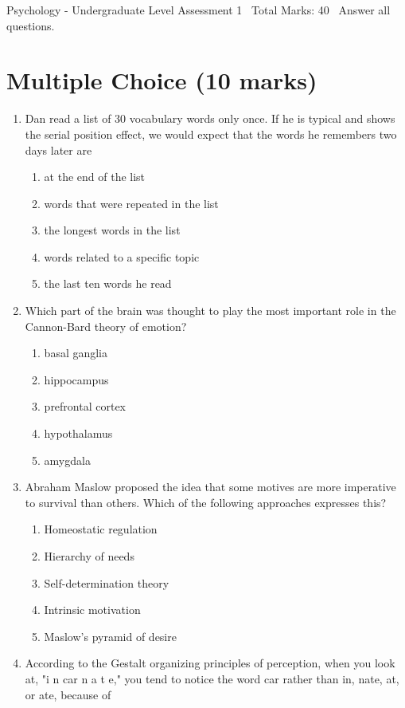 \documentclass[12pt]{article}
\begin{document}
\begin{center}
Psychology - Undergraduate Level Assessment 1 \
Total Marks: 40 \
Answer all questions.
\end{center}

\section*{Multiple Choice (10 marks)}
\begin{enumerate}[label=\arabic*.]
\item Dan read a list of 30 vocabulary words only once. If he is typical and shows the serial position effect, we would expect that the words he remembers two days later are
\begin{enumerate}[label=(\alph*)]
    \item at the end of the list
    \item words that were repeated in the list
    \item the longest words in the list
    \item words related to a specific topic
    \item the last ten words he read
\end{enumerate}
\item Which part of the brain was thought to play the most important role in the Cannon-Bard theory of emotion?
\begin{enumerate}[label=(\alph*)]
    \item basal ganglia
    \item hippocampus
    \item prefrontal cortex
    \item hypothalamus
    \item amygdala
\end{enumerate}
\item Abraham Maslow proposed the idea that some motives are more imperative to survival than others. Which of the following approaches expresses this?
\begin{enumerate}[label=(\alph*)]
    \item Homeostatic regulation
    \item Hierarchy of needs
    \item Self-determination theory
    \item Intrinsic motivation
    \item Maslow's pyramid of desire
\end{enumerate}
\item According to the Gestalt organizing principles of perception, when you look at, "i n car n a t e," you tend to notice the word car rather than in, nate, at, or ate, because of

\end{enumerate}
\end{document}
